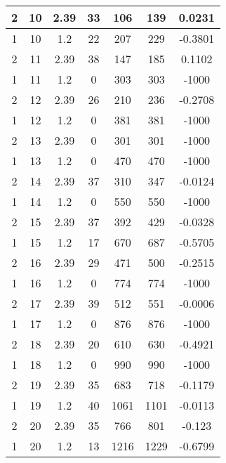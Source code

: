 \documentclass[letterpaper, 12pt]{article}
\begin{document}
\begin{longtable}{|c|c|c|c|c|c|c|}
\hline
2 & 10 & 2.39 & 33 & 106 & 139 & 0.0231 \\
\hline
1 & 10 & 1.2 & 22 & 207 & 229 & -0.3801 \\
\hline
2 & 11 & 2.39 & 38 & 147 & 185 & 0.1102 \\
\hline
1 & 11 & 1.2 & 0 & 303 & 303 & -1000 \\
\hline
2 & 12 & 2.39 & 26 & 210 & 236 & -0.2708 \\
\hline
1 & 12 & 1.2 & 0 & 381 & 381 & -1000 \\
\hline
2 & 13 & 2.39 & 0 & 301 & 301 & -1000 \\
\hline
1 & 13 & 1.2 & 0 & 470 & 470 & -1000 \\
\hline
2 & 14 & 2.39 & 37 & 310 & 347 & -0.0124 \\
\hline
1 & 14 & 1.2 & 0 & 550 & 550 & -1000 \\
\hline
2 & 15 & 2.39 & 37 & 392 & 429 & -0.0328 \\
\hline
1 & 15 & 1.2 & 17 & 670 & 687 & -0.5705 \\
\hline
2 & 16 & 2.39 & 29 & 471 & 500 & -0.2515 \\
\hline
1 & 16 & 1.2 & 0 & 774 & 774 & -1000 \\
\hline
2 & 17 & 2.39 & 39 & 512 & 551 & -0.0006 \\
\hline
1 & 17 & 1.2 & 0 & 876 & 876 & -1000 \\
\hline
2 & 18 & 2.39 & 20 & 610 & 630 & -0.4921 \\
\hline
1 & 18 & 1.2 & 0 & 990 & 990 & -1000 \\
\hline
2 & 19 & 2.39 & 35 & 683 & 718 & -0.1179 \\
\hline
1 & 19 & 1.2 & 40 & 1061 & 1101 & -0.0113 \\
\hline
2 & 20 & 2.39 & 35 & 766 & 801 & -0.123 \\
\hline
1 & 20 & 1.2 & 13 & 1216 & 1229 & -0.6799 \\
\hline
\end{longtable}
\end{document}
